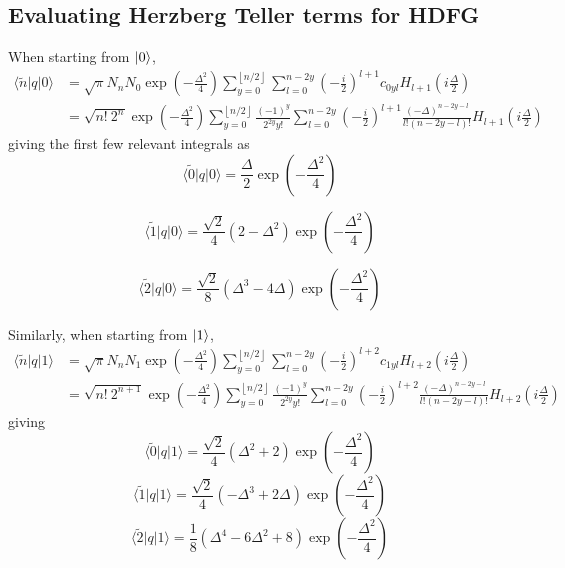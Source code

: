 \documentclass[aip, jcp, reprint, onecolumn, nofootinbib]{revtex4-2}
\begin{document}
\subsection{Evaluating Herzberg Teller terms for HDFG}
When starting from $\ket{0}$,
\begin{equation}
\begin{split}
	\langle \tilde{n} |q| 0 \rangle &= 
	\sqrt{\pi} N_n N_0 \exp(-\frac{\Delta^2}{4}) \sum_{y=0}^{\left\lfloor{n/2}\right\rfloor} \sum_{l=0}^{n-2y} \left( -\frac{i}{2} \right)^{l+1} c_{0yl} H_{l+1}\left(i\frac{\Delta}{2}\right) \\
	&= \sqrt{n! \ 2^n} \exp(-\frac{\Delta^2}{4})
	\sum_{y=0}^{\left\lfloor{n/2}\right\rfloor} 
	\frac{(-1)^y}{2^{2y}y!}
	\sum_{l=0}^{n-2y} \left( -\frac{i}{2} \right)^{l+1} 
	\frac{\left(-\Delta\right)^{n-2y-l}}{l!(n-2y-l)!}
	H_{l+1}\left(i\frac{\Delta}{2}\right)
\end{split}
\end{equation}
giving the first few relevant integrals as
\begin{equation}
	\langle \tilde{0} |q| 0 \rangle = \frac{\Delta}{2} \exp(-\frac{\Delta^2}{4})
\end{equation}

\begin{equation}
	\langle \tilde{1} |q| 0 \rangle = 
	\frac{\sqrt{2}}{4} \left( 2 - \Delta^2 \right)
	\exp(-\frac{\Delta^2}{4})
\end{equation}

\begin{equation}
	\langle \tilde{2} |q| 0 \rangle = 
	\frac{\sqrt{2}}{8} \left( \Delta^3 - 4 \Delta \right)
	\exp(-\frac{\Delta^2}{4})
\end{equation}

Similarly, when starting from $\ket{1}$, 
\begin{equation}
	\begin{split}
		\langle \tilde{n} |q| 1 \rangle &= \sqrt{\pi} N_n N_1 \exp(-\frac{\Delta^2}{4}) \sum_{y=0}^{\left\lfloor{n/2}\right\rfloor} \sum_{l=0}^{n-2y} \left( -\frac{i}{2} \right)^{l+2} c_{1yl} H_{l+2}\left(i\frac{\Delta}{2}\right) \\
		&= 
		\sqrt{n! \ 2^{n+1}} \exp(-\frac{\Delta^2}{4}) 
		\sum_{y=0}^{\left\lfloor{n/2}\right\rfloor} 
		\frac{(-1)^y}{2^{2y}y!}
		\sum_{l=0}^{n-2y} \left( -\frac{i}{2} \right)^{l+2} 
		\frac{\left(-\Delta\right)^{n-2y-l}}{l!(n-2y-l)!}
		H_{l+2}\left(i\frac{\Delta}{2}\right)
	\end{split}
\end{equation}
giving
\begin{equation}
	\langle \tilde{0} |q| 1 \rangle = \frac{\sqrt{2}}{4}\left( \Delta^2 + 2 \right)
	\exp(-\frac{\Delta^2}{4})
\end{equation}
\begin{equation}
	\langle \tilde{1} |q| 1 \rangle = \frac{\sqrt{2}}{4}\left( -\Delta^3 + 2\Delta \right)
	\exp(-\frac{\Delta^2}{4})
\end{equation}
\begin{equation}
	\langle \tilde{2} |q| 1 \rangle = \frac{1}{8} \left( \Delta^4 - 6\Delta^2 + 8 \right)
	\exp(-\frac{\Delta^2}{4})
\end{equation}
\end{document}
